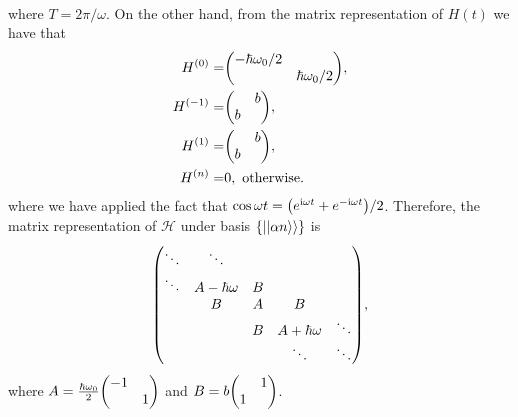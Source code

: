 \documentclass{article}
\newcommand{\iu}{\ensuremath{\mathrm{i}}}
\newcommand{\set}[1]{\ensuremath{\left\{{#1}\right\}}}
\newcommand{\kket}[1]{\ensuremath{\ket{\ket{#1}}}}
\begin{document}
\begin{enumerate}[1.]
\begin{enumerate}[(i)]
\begin{align*}
    \end{align*}
    where $T = 2\pi / \omega$. 
    On the other hand, from the matrix representation of $H(t)$ we have that 
    \begin{align*}
      H^{(0)} =& \mqty(-\hbar\omega_0/2 & \\ & \hbar\omega_0/2), \\
      H^{(-1)} =& \mqty( & b \\ b & ), \\
      H^{(1)} =& \mqty( & b \\ b & ), \\
      H^{(n)} =& 0, \text{ otherwise.}
    \end{align*}
    where we have applied the fact that $\cos\omega t = \qty(e^{\iu\omega t} + e^{-\iu\omega t})/2$.
    Therefore, the matrix representation of $\mathcal{H}$ under basis $\set{\kket{\alpha n}}$ is
    \begin{align*}
      \mqty(
        \ddots & \ddots           &   &                 &        \\
        \ddots & A - \hbar\omega  & B &                 &        \\
               & B                & A & B               &        \\
               &                  & B & A + \hbar\omega & \ddots \\
               &                  &   & \ddots          & \ddots
        ),
    \end{align*}
    where $A =  \frac{\hbar\omega_0}{2} \mqty(-1 & \\ & 1)$ and $B = b\mqty( & 1 \\ 1 &)$.


\end{enumerate}
\end{enumerate}
\end{document}

